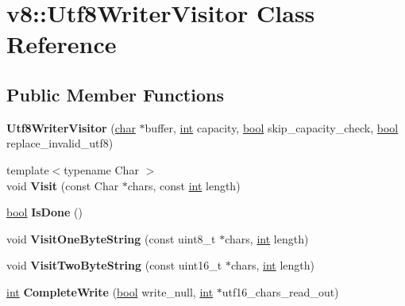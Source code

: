 \hypertarget{classv8_1_1Utf8WriterVisitor}{}\section{v8\+:\+:Utf8\+Writer\+Visitor Class Reference}
\label{classv8_1_1Utf8WriterVisitor}
\subsection*{Public Member Functions}
\begin{DoxyCompactItemize}
\item 
\mbox{\label{classv8_1_1Utf8WriterVisitor_a3694f00cd1412b382316d2e5d4702a95}} 
{\bfseries Utf8\+Writer\+Visitor} (\mbox{\hyperlink{classchar}{char}} $\ast$buffer, \mbox{\hyperlink{classint}{int}} capacity, \mbox{\hyperlink{classbool}{bool}} skip\+\_\+capacity\+\_\+check, \mbox{\hyperlink{classbool}{bool}} replace\+\_\+invalid\+\_\+utf8)
\item 
\mbox{\label{classv8_1_1Utf8WriterVisitor_a73670ab93ce35d25d59d586ed991c3f2}} 
{\footnotesize template$<$typename Char $>$ }\\void {\bfseries Visit} (const Char $\ast$chars, const \mbox{\hyperlink{classint}{int}} length)
\item 
\mbox{\label{classv8_1_1Utf8WriterVisitor_af6feff57948c678630eff22c27b08ff4}} 
\mbox{\hyperlink{classbool}{bool}} {\bfseries Is\+Done} ()
\item 
\mbox{\label{classv8_1_1Utf8WriterVisitor_a8853146988d0c7f9383c7efcbc243678}} 
void {\bfseries Visit\+One\+Byte\+String} (const uint8\+\_\+t $\ast$chars, \mbox{\hyperlink{classint}{int}} length)
\item 
\mbox{\label{classv8_1_1Utf8WriterVisitor_adb4582dcbadea98625a7097edae60fff}} 
void {\bfseries Visit\+Two\+Byte\+String} (const uint16\+\_\+t $\ast$chars, \mbox{\hyperlink{classint}{int}} length)
\item 
\mbox{\label{classv8_1_1Utf8WriterVisitor_a3e5ed708404a4e97695ff679184c4fdd}} 
\mbox{\hyperlink{classint}{int}} {\bfseries Complete\+Write} (\mbox{\hyperlink{classbool}{bool}} write\+\_\+null, \mbox{\hyperlink{classint}{int}} $\ast$utf16\+\_\+chars\+\_\+read\+\_\+out)
\end{DoxyCompactItemize}
